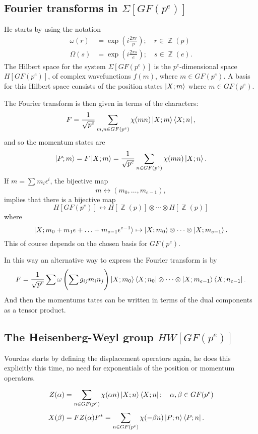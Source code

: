 \documentclass[a4paper]{article}
\DeclareMathOperator{\Z}{\mathbb{Z}}
\begin{document}
  \subsection{Fourier transforms in $\Sigma[GF(p^{e})]$}

  He starts by using the notation
  \begin{align*}
    \omega(r) &= \exp\left( i \frac{2\pi r}{p} \right);
    \quad r \in \Z(p)\\
    \Omega(s) &= \exp\left( i \frac{2\pi s}{e} \right);
    \quad s \in \Z(e).
  \end{align*}
  The Hilbert space for the system $\Sigma[GF(p^{e})]$ is
  the $p^{e}$-dimensional space $H[GF(p^{e})]$, of complex
  wavefunctions $f(m)$, where $m \in GF(p^{e})$. A basis
  for this Hilbert space consists of the position states
  $\ket{X; m}$ where $m \in GF(p^{e})$.

  The Fourier transform is then given in terms of the
  characters:
  \[
    F = \frac{1}{\sqrt{p^{e}}} \sum_{m,n \in
    GF(p^{e})}^{} \chi(mn) \ket{X; m} \bra{X; n},
  \] 
  and so the momentum states are
  \[
    \ket{P; m}
    = F\ket{X; m}
    = \frac{1}{\sqrt{p^{e}}} \sum_{n \in GF(p^{e})}^{}
    \chi(mn) \ket{X; n}.
  \] 
  If $m = \sum_{}^{} m_i \epsilon^{i}$, the bijective map
  \[
    m \leftrightarrow (m_0,\ldots,m_{e-1}),
  \] 
  implies that there is a bijective map
  \[
    H[GF(p^{e})]
    \leftrightarrow
    H[\Z(p)] \otimes \cdots \otimes H[\Z(p)]
  \] 
  where
  \[
    \ket{X; m_0 + m_1\epsilon + \ldots + m_{e-1}
    \epsilon^{e-1}} 
    \mapsto
    \ket{X; m_0} \otimes \cdots \otimes \ket{X; m_{e-1}}.
  \] 
  This of course depends on the chosen basis for
  $GF(p^{e})$.

  In this way an alternative way to express the Fourier
  transform is by
  \[
    F = \frac{1}{\sqrt{p^{e}}}
    \sum_{}^{} \omega\left( \sum_{}^{} g_{ij} m_i n_j \right) 
    \ket{X; m_0} \bra{X; n_0} \otimes \cdots \otimes
    \ket{X; m_{e-1}} \bra{X; n_{e-1}}.
  \] 
  And then the momentums tates can be written in terms of
  the dual components as a tensor product.

  \subsection{The Heisenberg-Weyl group $HW[GF(p^{e})]$}

  Vourdas starts by defining the displacement operators
  again, he does this explicitly this time, no need for
  exponentials of the position or momentum operators.
  \begin{align*}
    Z(\alpha)
    &= \sum_{n \in GF(p^{e})}^{} \chi(\alpha n) \ket{X; n}
    \bra{X; n};
    \quad
    \alpha, \beta \in GF(p^{e}) \\
    X(\beta)
    &= F Z(\alpha) F^{*}
    = \sum_{n \in GF(p^{e})}^{} \chi(-\beta n) \ket{P; n}
    \bra{P; n}.
  \end{align*}
\end{document}
